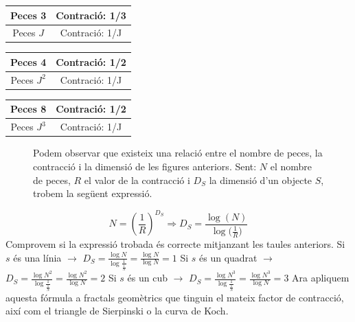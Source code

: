 \documentclass[12pt]{report}
\begin{document}
 \hspace*{0.5em}\begin{tabular}[t]{|c |c |}
\hline
Peces 3 & Contració: 1/3\\
\hline
Peces $J$ & Contració: 1/J\\
\hline
\end{tabular}      
\newline
      \newline
      
 \hspace*{0.5em}\begin{tabular}[t]{|c |c |}       
\hline
Peces 4 & Contració: 1/2\\
\hline
Peces $J^2$ & Contració: 1/J\\
\hline
\end{tabular}       
\newline
\newline
\newline
      
 \hspace*{0.5em}\begin{tabular}[t]{|c |c |}       
\hline
Peces 8 & Contració: 1/2\\
\hline
Peces $J^3$ & Contració: 1/J\\
\hline
\end{tabular}    
\newline 
\newline
\newline 
\newline
\newline
\newline 
\newline 
\begin{figure}
Podem observar que existeix una relació entre el nombre de peces, la contracció i la dimensió de les figures anteriors. 
\newline
Sent: $N$ el nombre de peces, $R$ el valor de la contracció i $D_S$ la dimensió d'un objecte $S$, trobem la següent expressió.
\end{figure}
\newline
$$N= {\left( \frac{1}{R} \right)}^{D_S} \Rightarrow D_S = \frac{ \log{(N)}}{\log{(\frac{1}{R}})}$$
Comprovem si la expressió trobada és correcte mitjanzant les taules anteriors.
\newline
Si $s$ és una línia $\longrightarrow$ $D_S = \frac{ \log{N}}{\log{\frac{1}{\frac{1}{N}}}} = \frac{\log{N}}{\log{N}} = 1$
\newline
Si $s$ és un quadrat $\longrightarrow$ $D_S = \frac{ \log{N^2}}{\log{\frac{1}{\frac{1}{N}}}} = \frac{\log{N^2}}{\log{N}} = 2$
\newline
Si $s$ és un cub $\longrightarrow$ $D_S = \frac{ \log{N^3}}{\log{\frac{1}{\frac{1}{N}}}} = \frac{\log{N^3}}{\log{N}} = 3$
\newline
Ara apliquem aquesta fórmula a fractals geomètrics que tinguin el mateix factor de contracció, així com el triangle de Sierpinski o la curva de Koch.
\newline
\end{document}
